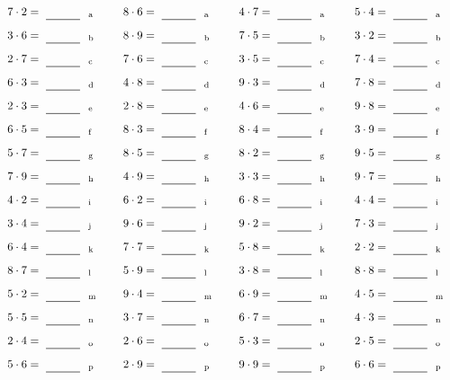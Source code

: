 \documentclass
[
  draft    = true,
  fontsize = 11pt,
  parskip  = half-
]
{scrartcl}
\begin{document}
\par\vfill\par
\begin{align*}
    \pline{7\cdot2}&=\rline{a}
  & \pline{8\cdot6}&=\rline{a}
  & \pline{4\cdot7}&=\rline{a}
  & \pline{5\cdot4}&=\rline{a} \\[1ex]
    \pline{3\cdot6}&=\rline{b}
  & \pline{8\cdot9}&=\rline{b}
  & \pline{7\cdot5}&=\rline{b}
  & \pline{3\cdot2}&=\rline{b} \\[1ex]
    \pline{2\cdot7}&=\rline{c}
  & \pline{7\cdot6}&=\rline{c}
  & \pline{3\cdot5}&=\rline{c}
  & \pline{7\cdot4}&=\rline{c} \\[1ex]
    \pline{6\cdot3}&=\rline{d}
  & \pline{4\cdot8}&=\rline{d}
  & \pline{9\cdot3}&=\rline{d}
  & \pline{7\cdot8}&=\rline{d} \\[1ex]
    \pline{2\cdot3}&=\rline{e}
  & \pline{2\cdot8}&=\rline{e}
  & \pline{4\cdot6}&=\rline{e}
  & \pline{9\cdot8}&=\rline{e} \\[1ex]
    \pline{6\cdot5}&=\rline{f}
  & \pline{8\cdot3}&=\rline{f}
  & \pline{8\cdot4}&=\rline{f}
  & \pline{3\cdot9}&=\rline{f} \\[1ex]
    \pline{5\cdot7}&=\rline{g}
  & \pline{8\cdot5}&=\rline{g}
  & \pline{8\cdot2}&=\rline{g}
  & \pline{9\cdot5}&=\rline{g} \\[1ex]
    \pline{7\cdot9}&=\rline{h}
  & \pline{4\cdot9}&=\rline{h}
  & \pline{3\cdot3}&=\rline{h}
  & \pline{9\cdot7}&=\rline{h} \\[1ex]
    \pline{4\cdot2}&=\rline{i}
  & \pline{6\cdot2}&=\rline{i}
  & \pline{6\cdot8}&=\rline{i}
  & \pline{4\cdot4}&=\rline{i} \\[1ex]
    \pline{3\cdot4}&=\rline{j}
  & \pline{9\cdot6}&=\rline{j}
  & \pline{9\cdot2}&=\rline{j}
  & \pline{7\cdot3}&=\rline{j} \\[1ex]
    \pline{6\cdot4}&=\rline{k}
  & \pline{7\cdot7}&=\rline{k}
  & \pline{5\cdot8}&=\rline{k}
  & \pline{2\cdot2}&=\rline{k} \\[1ex]
    \pline{8\cdot7}&=\rline{l}
  & \pline{5\cdot9}&=\rline{l}
  & \pline{3\cdot8}&=\rline{l}
  & \pline{8\cdot8}&=\rline{l} \\[1ex]
    \pline{5\cdot2}&=\rline{m}
  & \pline{9\cdot4}&=\rline{m}
  & \pline{6\cdot9}&=\rline{m}
  & \pline{4\cdot5}&=\rline{m} \\[1ex]
    \pline{5\cdot5}&=\rline{n}
  & \pline{3\cdot7}&=\rline{n}
  & \pline{6\cdot7}&=\rline{n}
  & \pline{4\cdot3}&=\rline{n} \\[1ex]
    \pline{2\cdot4}&=\rline{o}
  & \pline{2\cdot6}&=\rline{o}
  & \pline{5\cdot3}&=\rline{o}
  & \pline{2\cdot5}&=\rline{o} \\[1ex]
    \pline{5\cdot6}&=\rline{p}
  & \pline{2\cdot9}&=\rline{p}
  & \pline{9\cdot9}&=\rline{p}
  & \pline{6\cdot6}&=\rline{p}
\end{align*}
\end{document}
